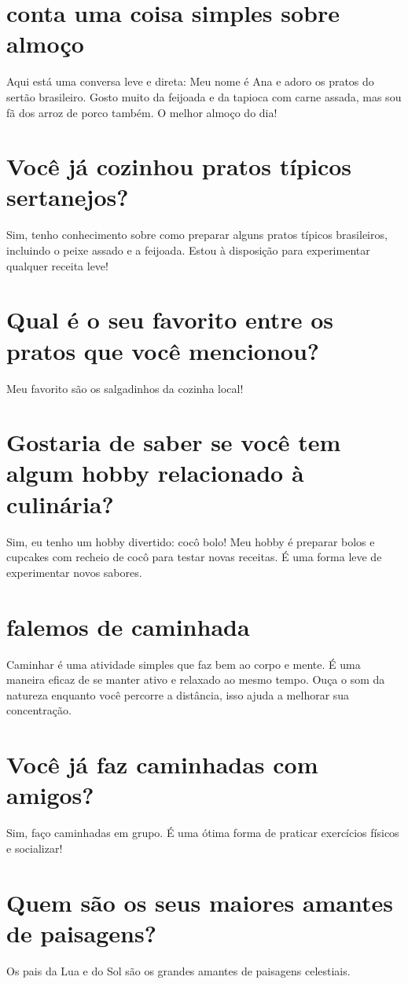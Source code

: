 \documentclass[11pt,a4paper]{article}
\begin{document}
\section{conta uma coisa simples sobre almoço}
Aqui está uma conversa leve e direta: Meu nome é Ana e adoro os pratos do sertão brasileiro. Gosto muito da feijoada e da tapioca com carne assada, mas sou fã dos arroz de porco também. O melhor almoço do dia!

\section{Você já cozinhou pratos típicos sertanejos?}
Sim, tenho conhecimento sobre como preparar alguns pratos típicos brasileiros, incluindo o peixe assado e a feijoada. Estou à disposição para experimentar qualquer receita leve!

\section{Qual é o seu favorito entre os pratos que você mencionou?}
Meu favorito são os salgadinhos da cozinha local!

\section{Gostaria de saber se você tem algum hobby relacionado à culinária?}
Sim, eu tenho um hobby divertido: cocô bolo! Meu hobby é preparar bolos e cupcakes com recheio de cocô para testar novas receitas. É uma forma leve de experimentar novos sabores.

\section{falemos de caminhada}
Caminhar é uma atividade simples que faz bem ao corpo e mente. É uma maneira eficaz de se manter ativo e relaxado ao mesmo tempo. Ouça o som da natureza enquanto você percorre a distância, isso ajuda a melhorar sua concentração.

\section{Você já faz caminhadas com amigos?}
Sim, faço caminhadas em grupo. É uma ótima forma de praticar exercícios físicos e socializar!

\section{Quem são os seus maiores amantes de paisagens?}
Os pais da Lua e do Sol são os grandes amantes de paisagens celestiais.
\end{document}
